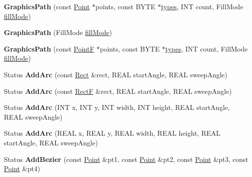 \begin{DoxyCompactItemize}
\item 
\mbox{\label{class_graphics_path_abe7adecd74c852e2fb91748181149971}} 
{\bfseries Graphics\+Path} (const \hyperlink{struct_point}{Point} $\ast$points, const B\+Y\+TE $\ast$\hyperlink{structtypes}{types}, I\+NT count, Fill\+Mode \hyperlink{interfacevoid}{fill\+Mode})
\item 
\mbox{\label{class_graphics_path_ad961ca96d7744db990e58121e516aed9}} 
{\bfseries Graphics\+Path} (Fill\+Mode \hyperlink{interfacevoid}{fill\+Mode})
\item 
\mbox{\label{class_graphics_path_a57f51f5124a4cabd66363d3e0351e59a}} 
{\bfseries Graphics\+Path} (const \hyperlink{struct_point_f}{PointF} $\ast$points, const B\+Y\+TE $\ast$\hyperlink{structtypes}{types}, I\+NT count, Fill\+Mode \hyperlink{interfacevoid}{fill\+Mode})
\item 
\mbox{\label{class_graphics_path_a03141e6b51fbe011f7a697d3054f814e}} 
Status {\bfseries Add\+Arc} (const \hyperlink{struct_rect}{Rect} \&rect, R\+E\+AL start\+Angle, R\+E\+AL sweep\+Angle)
\item 
\mbox{\label{class_graphics_path_a68db3297fed679ecd7e2ebc104c6db7b}} 
Status {\bfseries Add\+Arc} (const \hyperlink{struct_rect_f}{RectF} \&rect, R\+E\+AL start\+Angle, R\+E\+AL sweep\+Angle)
\item 
\mbox{\label{class_graphics_path_a90f18fbfba8e297a57c3d0b67c495443}} 
Status {\bfseries Add\+Arc} (I\+NT x, I\+NT y, I\+NT width, I\+NT height, R\+E\+AL start\+Angle, R\+E\+AL sweep\+Angle)
\item 
\mbox{\label{class_graphics_path_ac3248c7ae18cf9d9539d26abd024207b}} 
Status {\bfseries Add\+Arc} (R\+E\+AL x, R\+E\+AL y, R\+E\+AL width, R\+E\+AL height, R\+E\+AL start\+Angle, R\+E\+AL sweep\+Angle)
\item 
\mbox{\label{class_graphics_path_a71687075b43584b0cde0efd6994a2c72}} 
Status {\bfseries Add\+Bezier} (const \hyperlink{struct_point}{Point} \&pt1, const \hyperlink{struct_point}{Point} \&pt2, const \hyperlink{struct_point}{Point} \&pt3, const \hyperlink{struct_point}{Point} \&pt4)

\end{DoxyCompactItemize}
